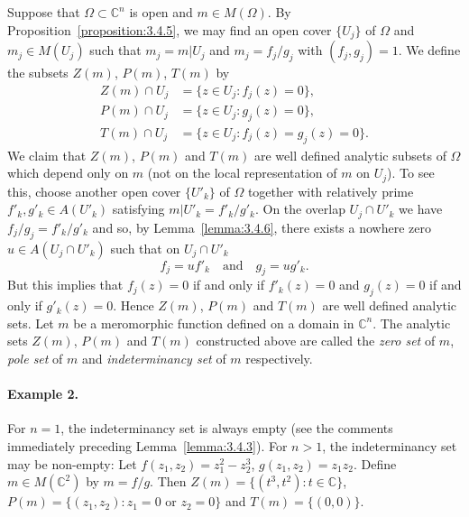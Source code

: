 Suppose that $\Omega\subset\mathbb C^n$ is open and $m\in M(\Omega)$. By Proposition~\ref{proposition:3.4.5}, we may find an open cover $\{U_j\}$ of $\Omega$ and $m_j\in M(U_j)$ such that $m_j=m|U_j$ and $m_j=f_j/g_j$ with $(f_j,g_j)=1$. We define the subsets $Z(m)$, $P(m)$, $T(m)$ by
\begin{align*}
Z(m)\cap U_j&=\{z\in U_j:f_j(z)=0\},\\
P(m)\cap U_j&=\{z\in U_j:g_j(z)=0\},\\
T(m)\cap U_j&=\{z\in U_j:f_j(z)=g_j(z)=0\}.
\end{align*}
We claim that $Z(m)$, $P(m)$ and $T(m)$ are well defined analytic subsets of $\Omega$ which depend only on $m$ (not on the local representation of $m$ on $U_j$). To see this, choose another open cover $\{U'_k\}$ of $\Omega$ together with relatively prime $f'_k,g'_k\in A(U'_k)$ satisfying $m|U'_k=f'_k/g'_k$. On the overlap $U_j\cap U'_k$ we have $f_j/g_j=f'_k/g'_k$ and so, by Lemma~\ref{lemma:3.4.6}, there exists a nowhere zero $u\in A(U_j\cap U'_k)$ such that on $U_j\cap U'_k$
\[f_j=uf'_k\quad\text{and}\quad g_j=ug'_k.\]
But this implies that $f_j(z)=0$ if and only if $f'_k(z)=0$ and $g_j(z)=0$ if and only if $g'_k(z)=0$. Hence $Z(m)$, $P(m)$ and $T(m)$ are well defined analytic sets.
 Let $m$ be a meromorphic function defined on a domain in $\mathbb C^n$. The analytic sets $Z(m)$, $P(m)$ and $T(m)$ constructed above are called the \emph{zero set} of $m$, \emph{pole set} of $m$ and \emph{indeterminancy set} of $m$ respectively.
\paragraph*{Example 2.} For $n=1$, the indeterminancy set is always empty (see the comments immediately preceding Lemma~\ref{lemma:3.4.3}). For $n>1$, the indeterminancy set may be non-empty: Let $f(z_1,z_2)=z_1^2-z_2^3$, $g(z_1,z_2)=z_1z_2$. Define $m\in M(\mathbb C^2)$ by $m=f/g$. Then $Z(m)=\{(t^3,t^2):t\in\mathbb C\}$, $P(m)=\{(z_1,z_2):z_1=0\text{ or }z_2=0\}$ and $T(m)=\{(0,0)\}$.


